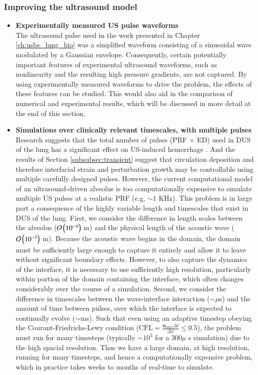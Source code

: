 \subsubsection{Improving the ultrasound model}
\begin{itemize}
\item \textbf{Experimentally measured \ac{US} pulse waveforms}\\
  The ultrasound pulse used in the work presented in Chapter
  \ref{ch:usbe_lung_bio} was a simplified waveform consisting of a
  sinusoidal wave modulated by a Gaussian envelope. Consequently,
  certain potentially important features of experimental ultrasound
  waveforms, such as nonlinearity and the resulting high pressure
  gradients, are not captured. By using experimentally measured
  waveforms to drive the problem, the effects of these features can be
  studied. This would also aid in the comparison of numerical and
  experimental results, which will be discussed in more detail at the
  end of this section.

\item \textbf{Simulations over clinically relevant timescales, with
    multiple pulses}\\Research suggests that the total number of
  pulses (\ac{PRF} $\times$ \ac{ED}) used in \ac{DUS} of the lung has
  a significant effect on \ac{US}-induced hemorrhage
  \citep{OBrien2005,OBrien2001a}. And the results of Section
  \ref{subsubsec:transient} suggest that circulation deposition and
  therefore interfacial strain and perturbation growth may be
  controllable using multiple carefully designed pulses. However, the
  current computational model of an ultrasound-driven alveolus is too
  computationally expensive to simulate multiple \ac{US} pulses at a
  realistic \ac{PRF} (e.g, $\sim 1$ KHz). This problem is in large
  part a consequence of the highly variable length and timescales that
  exist in \ac{DUS} of the lung. First, we consider the difference in
  length scales between the alveolus ($\mathcal{O}\left(10^{-4}\right)$ m) and the
  physical length of the acoustic wave ($\mathcal{O}\left(10^{-3}\right)$
  m). Because the acoustic wave begins in the domain, the domain must
  be sufficiently large enough to capture it entirely and allow it to
  leave without significant boundary effects. However, to also capture
  the dynamics of the interface, it is necessary to use sufficiently
  high resolution, particularly within portion of the domain
  containing the interface, which often changes considerably over the
  course of a simulation. Second, we consider the difference in
  timescales between the wave-interface interaction ($\sim\mu$s) and
  the amount of time between pulses, over which the interface is
  expected to continually evolve ($\sim$ms). Such that even using an
  adaptive timestep obeying the Courant-Friedrichs-Lewy condition
  ($\mbox{CFL} = \frac{\boldsymbol{u}_{max}\Delta t}{\Delta x}\leq
  0.5$), the problem must run for many timesteps (typically
  $\sim{10^5}$ for a $300 \mu$ s simulation) due to the high spacial
  resolution. Thus we have a large domain, at high resolution, running
  for many timesteps, and hence a computationally expensive problem,
  which in practice takes weeks to months of real-time to simulate.
  

\end{itemize}
